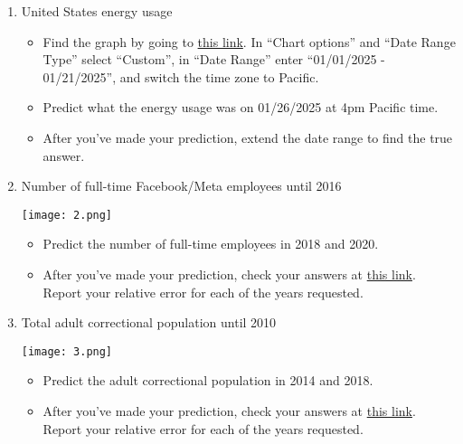 \documentclass[11pt]{article}
\begin{document}
\begin{enumerate}
	\item United States energy usage
	
	\begin{itemize}
          \item Find the graph by going to \href{https://www.eia.gov/electricity/gridmonitor/expanded-view/electric_overview/US48/US48/ElectricityOverview-2/edit}{this link}. In ``Chart options'' and ``Date Range Type'' select ``Custom'', in ``Date Range'' enter ``01/01/2025 - 01/21/2025'', and switch the time zone to Pacific.
          \item Predict what the energy usage was on 01/26/2025 at 4pm Pacific time.
          \item After you've made your prediction, extend the date range to find the true answer.
	\end{itemize}
	
	\item Number of full-time Facebook/Meta employees until 2016
	
	\begin{center}	
		\texttt{[image: 2.png]}
	\end{center}

	\begin{itemize}
		\item Predict the number of full-time employees in 2018 and 2020.
            \item After you've made your prediction, check your answers at \href{https://www.globaldata.com/data-insights/technology--media-and-telecom/metas-employee-headcount/}{this link}. Report your relative error for each of the years requested.
	\end{itemize}
	
	\item Total adult correctional population until 2010

	\begin{center}	
		\texttt{[image: 3.png]}
	\end{center}


	\begin{itemize}
		\item Predict the adult correctional population in 2014 and 2018.
            \item After you've made your prediction, check your answers at \href{https://bjs.ojp.gov/data/key-statistics#total-correction-population}{this link}. Report your relative error for each of the years requested.
	\end{itemize}
	

\end{enumerate}
\end{document}
